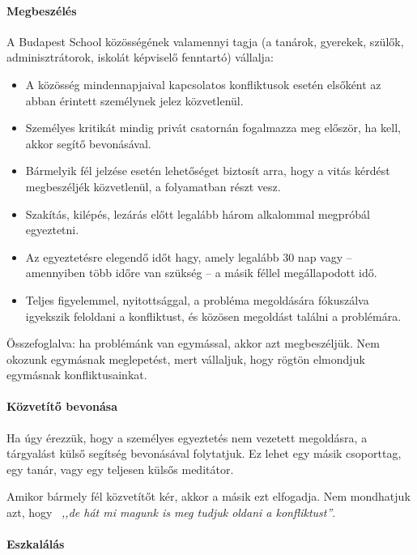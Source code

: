 \paragraph{Megbeszélés}

A Budapest School közösségének valamennyi tagja (a tanárok, gyerekek, szülők, adminisztrátorok, iskolát képviselő fenntartó) vállalja:

\begin{itemize}

      \item A közösség mindennapjaival kapcsolatos konfliktusok esetén elsőként az abban érintett személynek jelez közvetlenül.
      \item Személyes kritikát mindig privát csatornán fogalmazza meg először, ha kell, akkor segítő bevonásával.
      \item   Bármelyik fél jelzése esetén lehetőséget biztosít arra, hogy a vitás kérdést megbeszéljék közvetlenül, a folyamatban részt vesz.
      \item
            Szakítás, kilépés, lezárás előtt legalább három alkalommal megpróbál egyeztetni.
      \item
            Az egyeztetésre elegendő időt hagy, amely legalább 30 nap vagy -- amennyiben több időre van szükség -- a másik féllel megállapodott idő.
      \item
            Teljes figyelemmel, nyitottsággal, a probléma megoldására fókuszálva igyekszik feloldani a konfliktust, és közösen megoldást találni a problémára.
\end{itemize}

Összefoglalva: ha problémánk van egymással, akkor azt megbeszéljük. Nem okozunk egymásnak meglepetést, mert vállaljuk, hogy rögtön elmondjuk egymásnak konfliktusainkat.

\paragraph{Közvetítő bevonása}

Ha úgy érezzük, hogy a személyes egyeztetés nem vezetett megoldásra, a tárgyalást külső segítség bevonásával folytatjuk. Ez lehet egy másik csoporttag, egy tanár, vagy egy teljesen külsős meditátor.

Amikor bármely fél közvetítőt kér, akkor a másik ezt elfogadja. Nem mondhatjuk azt, hogy  \emph{,,de hát mi magunk is meg tudjuk oldani a konfliktust''}.

\paragraph{Eszkalálás}

